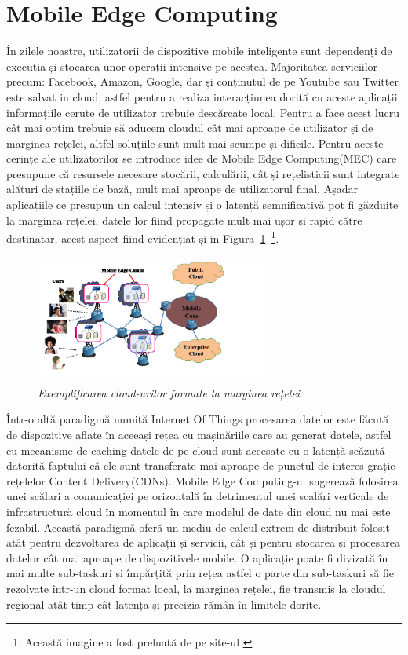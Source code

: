\documentclass[12pt,a4paper]{report}
\begin{document}
\section{Mobile Edge Computing}
În zilele noastre, utilizatorii de dispozitive mobile inteligente sunt dependenți de execuția și stocarea unor operații intensive pe acestea. Majoritatea serviciilor precum: Facebook, Amazon, Google, dar și conținutul de pe Youtube sau Twitter este salvat in cloud, astfel pentru a realiza interacțiunea dorită cu aceste aplicații informațiile cerute de utilizator trebuie descărcate local. Pentru a face acest lucru cât mai optim trebuie să aducem cloudul cât mai aproape de utilizator și de marginea rețelei, altfel soluțiile sunt mult mai scumpe și dificile. Pentru aceste cerințe ale utilizatorilor se introduce idee de Mobile Edge Computing(MEC) care presupune că resursele necesare stocării, calculării, cât și rețelisticii sunt integrate alături de stațiile de bază, mult mai aproape de utilizatorul final. Așadar aplicațiile ce presupun un calcul intensiv și o latență semnificativă pot fi găzduite la marginea rețelei, datele lor fiind propagate mult mai ușor și rapid către destinatar, acest aspect fiind evidențiat și in Figura~\ref{fig:pic0}~\footnote{Această imagine a fost preluată de pe site-ul \cite{MECPicture} }.
\begin{figure}[th]
\centering
\includegraphics[width=3in]{pics/mobile-edge-computing.jpg}
  \caption{\emph{Exemplificarea cloud-urilor formate la marginea rețelei}}
  \label{fig:pic0}
\end{figure}
Într-o altă paradigmă numită Internet Of Things procesarea datelor este făcută de dispozitive aflate în aceeași rețea cu mașinăriile care au generat datele, astfel cu mecanisme de caching datele de pe cloud sunt accesate cu o latență scăzută datorită faptului că ele sunt transferate mai aproape de punctul de interes grație rețelelor Content Delivery(CDNs). Mobile Edge Computing-ul\cite{MecSurvey} sugerează folosirea unei scălari a comunicației pe orizontală în detrimentul unei scalări verticale de infrastructură cloud în momentul în care modelul de date din cloud nu mai este fezabil. Această paradigmă oferă un mediu de calcul extrem de distribuit folosit atât pentru dezvoltarea de aplicații și servicii, cât și pentru stocarea și procesarea datelor cât mai aproape de dispozitivele mobile. O aplicație poate fi divizată în mai multe sub-taskuri și împărțită prin rețea astfel o parte din sub-taskuri să fie rezolvate într-un cloud format local, la marginea rețelei, fie transmis la cloudul regional atât timp cât latența și precizia rămân în limitele dorite.
\end{document}
